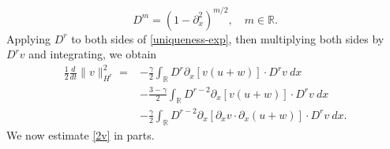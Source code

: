 \documentclass[12pt,reqno]{amsart}
\numberwithin{equation}{section}  %
\numberwithin{figure}{section}
\newcommand{\rr}{\mathbb{R}}
\newcommand{\p}{\partial}
\begin{document}
\begin{equation*}
	D^{m} = (1 - \p_x^2)^{m/2}, \quad m \in \rr.
\end{equation*}
%
Applying $D^r$ to both sides of \eqref{uniqueness-exp}, then 
multiplying both sides by $D^r v$ and integrating, we obtain
%
%
\begin{equation}
\begin{split}
 \frac{1}{2} \frac{d}{dt} \|v\|_{H^r}^2
 = & -\frac{\gamma}{2} \int_{\rr} D^r \p_x [v(u+w)] \cdot
D^r v \ dx
\\
& - \frac{3-\gamma}{2} \int_{\rr}  D^{r -2}
\p_x[v(u+w)] \cdot
D^r v \ dx  
\\
& - \frac{\gamma}{2} \int_{\rr} D^{r 
-2} \p_x [ \p_x v
\cdot \p_x (u+w)]\cdot D^r v \ dx.
\label{2v}
\end{split}
\end{equation}
%
%
We now estimate \eqref{2v} in parts.
\end{document}
